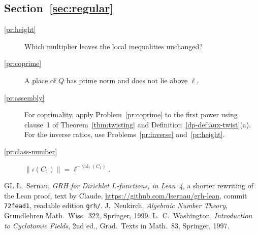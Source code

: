 \documentclass[reqno]{amsart}
\theoremstyle{definition}
\theoremstyle{plain}
\newcommand{\val}{\operatorname{val}}
\begin{document}
\subsection*{Section~\ref{sec:regular}}
\begin{description}
\item[\ref{pr:height}] Which multiplier leaves the local inequalities unchanged?
\item[\ref{pr:coprime}] A place of \(Q\) has prime norm and does not lie above \(\ell\).
\item[\ref{pr:assembly}] For coprimality, apply Problem~\ref{pr:coprime} to the first power using clause~1 of Theorem~\ref{thm:twisting} and Definition~\ref{dp-def:aux-twist}(a).  For the inverse ratios, use Problems~\ref{pr:inverse} and~\ref{pr:height}.
\item[\ref{pr:class-number}] \(\lVert\iota(C_1)\rVert = \ell^{-\val_\ell(C_1)}\).
\end{description}

\begin{thebibliography}{GL}
 L.~Sernau, \emph{GRH for Dirichlet \(L\)-functions, in Lean~4}, a shorter rewriting of the Lean proof, text by Claude, \url{https://github.com/lsernau/grh-lean}, commit \texttt{72fead1}, readable edition \texttt{grh/}.
 J.~Neukirch, \emph{Algebraic Number Theory}, Grundlehren Math.\ Wiss.\ 322, Springer, 1999.
 L.~C.~Washington, \emph{Introduction to Cyclotomic Fields}, 2nd ed., Grad.\ Texts in Math.\ 83, Springer, 1997.
\end{thebibliography}
\end{document}
